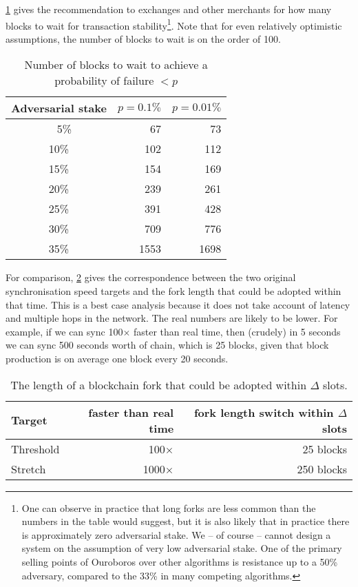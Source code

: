\documentclass[11pt,a4paper]{article}
\begin{document}
\cref{table:tx-stability} gives the recommendation to exchanges and other
merchants for how many blocks to wait for transaction stability\footnote{One
can observe in practice that long forks are less common than the numbers in the
table would suggest, but it is also likely that in practice there is
approximately zero adversarial stake. We -- of course -- cannot design a system
on the assumption of very low adversarial stake. One of the primary selling
points of Ouroboros over other algorithms is resistance up to a 50\% adversary,
compared to the 33\% in many competing algorithms.}. Note that for even
relatively optimistic assumptions, the number of blocks to wait is on the order
of 100.
\begin{table}[ht]
\centering
\begin{tabular}[]{crr}
  Adversarial stake & $p = 0.1\%$ & $p = 0.01\%$ \\
  \toprule
 ~~5\% &   67 &   73 \\
  10\% &  102 &  112 \\
  15\% &  154 &  169 \\
  20\% &  239 &  261 \\
  25\% &  391 &  428 \\
  30\% &  709 &  776 \\
  35\% & 1553 & 1698 \\
\end{tabular}
\caption{Number of blocks to wait to achieve a probability of failure $< p$}
\label{table:tx-stability}
\end{table}

For comparison, \cref{table:fork-switching} gives the correspondence between
the two original synchronisation speed targets and the fork length that could
be adopted within that time. This is a best case analysis because it does not
take account of latency and multiple hops in the network. The real numbers are
likely to be lower. For example, if we can sync 100$\times$ faster than real
time, then (crudely) in 5 seconds we can sync 500 seconds worth of chain, which
is 25 blocks, given that block production is on average one block every 20
seconds.
\begin{table}[ht]
\centering
\begin{tabular}[]{lrr}
  Target    & faster than real time & fork length switch within $\Delta$ slots \\
  \toprule
  Threshold &  100$\times$ &  25 blocks \\
  Stretch   & 1000$\times$ & 250 blocks
\end{tabular}
\caption{The length of a blockchain fork that could be adopted within $\Delta$
         slots.}
\label{table:fork-switching}
\end{table}
\end{document}
